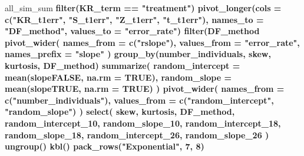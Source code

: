 \documentclass[12pt, twoside]{amherstthesis}
\newenvironment{Shaded}{\begin{snugshade}}{\end{snugshade}}
\newcommand{\DataTypeTok}[1]{\textcolor[rgb]{0.13,0.29,0.53}{#1}}
\newcommand{\DecValTok}[1]{\textcolor[rgb]{0.00,0.00,0.81}{#1}}
\newcommand{\KeywordTok}[1]{\textcolor[rgb]{0.13,0.29,0.53}{\textbf{#1}}}
\newcommand{\NormalTok}[1]{#1}
\newcommand{\OperatorTok}[1]{\textcolor[rgb]{0.81,0.36,0.00}{\textbf{#1}}}
\newcommand{\OtherTok}[1]{\textcolor[rgb]{0.56,0.35,0.01}{#1}}
\newcommand{\StringTok}[1]{\textcolor[rgb]{0.31,0.60,0.02}{#1}}
\begin{document}
\begin{Shaded}
\begin{Highlighting}[]
\NormalTok{all_sim_sum }\OperatorTok{%>%}
\StringTok{  }\KeywordTok{filter}\NormalTok{(KR_term }\OperatorTok{==}\StringTok{ "treatment"}\NormalTok{) }\OperatorTok{%>%}
\StringTok{  }\KeywordTok{pivot_longer}\NormalTok{(}\DataTypeTok{cols =} \KeywordTok{c}\NormalTok{(}\StringTok{"KR_t1err"}\NormalTok{, }\StringTok{"S_t1err"}\NormalTok{, }\StringTok{"Z_t1err"}\NormalTok{, }\StringTok{"t_t1err"}\NormalTok{), }
               \DataTypeTok{names_to =} \StringTok{"DF_method"}\NormalTok{, }\DataTypeTok{values_to =} \StringTok{"error_rate"}\NormalTok{) }\OperatorTok{%>%}
\StringTok{  }\KeywordTok{filter}\NormalTok{(DF_method }\OperatorTok{%in%}\StringTok{ }\KeywordTok{c}\NormalTok{(}\StringTok{"Z_t1err"}\NormalTok{, }\StringTok{"t_t1err"}\NormalTok{)) }\OperatorTok{%>%}
\StringTok{  }\KeywordTok{pivot_wider}\NormalTok{(}
    \DataTypeTok{names_from =} \KeywordTok{c}\NormalTok{(}\StringTok{"rslope"}\NormalTok{),}
    \DataTypeTok{values_from =} \StringTok{"error_rate"}\NormalTok{, }\DataTypeTok{names_prefix =} \StringTok{"slope"}
\NormalTok{  ) }\OperatorTok{%>%}
\StringTok{  }\KeywordTok{group_by}\NormalTok{(number_individuals, skew, kurtosis, DF_method) }\OperatorTok{%>%}
\StringTok{  }\KeywordTok{summarize}\NormalTok{(}
    \DataTypeTok{random_intercept =} \KeywordTok{mean}\NormalTok{(slopeFALSE, }\DataTypeTok{na.rm =} \OtherTok{TRUE}\NormalTok{),}
    \DataTypeTok{random_slope =} \KeywordTok{mean}\NormalTok{(slopeTRUE, }\DataTypeTok{na.rm =} \OtherTok{TRUE}\NormalTok{)}
\NormalTok{  ) }\OperatorTok{%>%}
\StringTok{  }\KeywordTok{pivot_wider}\NormalTok{(}
    \DataTypeTok{names_from =} \KeywordTok{c}\NormalTok{(}\StringTok{"number_individuals"}\NormalTok{),}
    \DataTypeTok{values_from =} \KeywordTok{c}\NormalTok{(}\StringTok{"random_intercept"}\NormalTok{, }\StringTok{"random_slope"}\NormalTok{)}
\NormalTok{  ) }\OperatorTok{%>%}
\StringTok{  }\KeywordTok{select}\NormalTok{(}
\NormalTok{    skew, kurtosis, DF_method, random_intercept_}\DecValTok{10}\NormalTok{, random_slope_}\DecValTok{10}\NormalTok{, }
\NormalTok{    random_intercept_}\DecValTok{18}\NormalTok{,}
\NormalTok{    random_slope_}\DecValTok{18}\NormalTok{, random_intercept_}\DecValTok{26}\NormalTok{, random_slope_}\DecValTok{26}
\NormalTok{  ) }\OperatorTok{%>%}
\StringTok{  }\KeywordTok{ungroup}\NormalTok{() }\OperatorTok{%>%}
\StringTok{  }\KeywordTok{kbl}\NormalTok{() }\OperatorTok{%>%}
\StringTok{  }\KeywordTok{pack_rows}\NormalTok{(}\StringTok{"Exponential"}\NormalTok{, }\DecValTok{7}\NormalTok{, }\DecValTok{8}\NormalTok{) }\OperatorTok{%>%}
}}}}}}}}}}}}
\end{Highlighting}
\end{Shaded}
\end{document}
